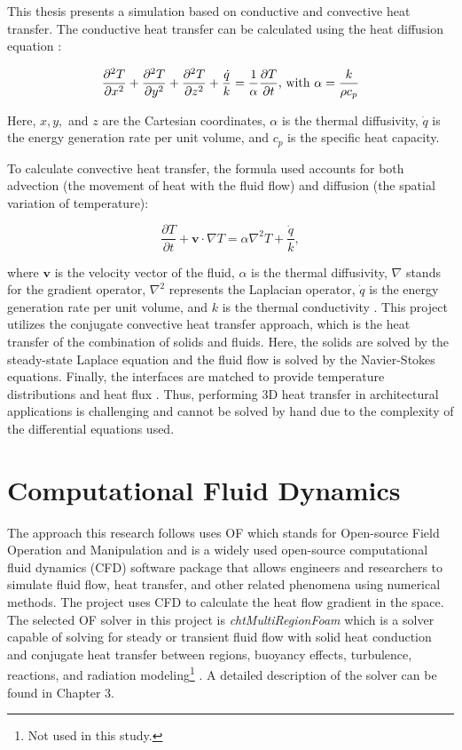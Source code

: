 This thesis presents a simulation based on conductive and convective heat transfer. 
The conductive heat transfer can be calculated using the heat diffusion equation \cite{bergman2011fundamentals}:
	
	\begin{equation} 
	\frac{\partial^2 T}{\partial x^2}+
	\frac{\partial^2 T}{\partial y^2}+
	\frac{\partial^2 T}{\partial z^2}+ 
	\frac{\dot{q}}{k}= \frac{1}{\alpha}\frac{\partial T}{\partial t} \text{, with } \alpha = \frac{k}{\rho c_p}\quad \\
	\end{equation}
	
	
Here, $x,y,$ and $z$ are the Cartesian coordinates, $\alpha$ is the thermal diffusivity, $\dot{q}$ is the energy generation rate per unit volume, and $c_p$ is the specific heat capacity.
 
To calculate convective heat transfer, the formula used accounts for both advection (the movement of heat with the fluid flow) and diffusion (the spatial variation of temperature): 

\begin{equation}
    \frac{\partial T}{\partial t} + \mathbf{v} \cdot \nabla T = \alpha \nabla^2 T + \frac{\dot{q}}{k},
\end{equation}

where $\mathbf{v}$ is the velocity vector of the fluid, $\alpha$ is the thermal diffusivity, $\nabla$ stands for the gradient operator, $\nabla^2$ represents the Laplacian operator, $\dot{q}$ is the energy generation rate per unit volume, and $k$ is the thermal conductivity \cite{bergman2011fundamentals}. This project utilizes the conjugate convective heat transfer approach, which is the heat transfer of the combination of solids and fluids. Here, the solids are solved by the steady-state Laplace equation and the fluid flow is solved by the Navier-Stokes equations. Finally, the interfaces are matched to provide temperature distributions and heat flux \cite{Zhao2007}. Thus, performing 3D heat transfer in architectural applications is challenging and cannot be solved by hand due to the complexity of the differential equations used.



\section{Computational Fluid Dynamics}
The approach this research follows uses \gls{OF} which stands for Open-source Field Operation and Manipulation and is a widely used open-source computational fluid dynamics  (CFD) software package that allows engineers and researchers to simulate fluid flow, heat transfer, and other related phenomena using numerical methods. The project uses CFD to calculate the heat flow gradient in the space. The selected \gls{OF} solver in this project is \textit{chtMultiRegionFoam} which is a solver capable of solving for steady or transient fluid flow with solid heat conduction and conjugate heat transfer between regions, buoyancy effects, turbulence, reactions, and radiation modeling\footnote{Not used in this study.} \cite{cht}. A detailed description of the solver can be found in Chapter 3.


